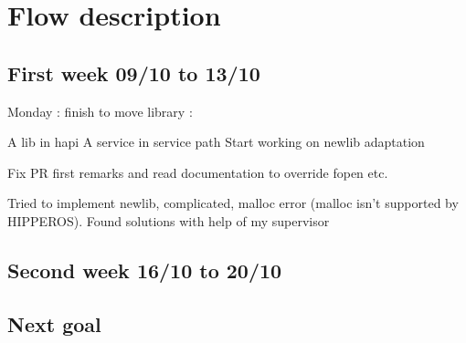 \documentclass[12pt]{article}
\begin{document}
\section{Flow description}
\subsection{First week 09/10 to 13/10}
Monday : finish to move library :

A lib in hapi
A service in service path
Start working on newlib adaptation

Fix PR first remarks and read documentation to override fopen etc.

Tried to implement newlib, complicated, malloc error (malloc isn't supported 
by HIPPEROS). 
Found solutions with help of my supervisor

\subsection{Second week 16/10 to 20/10}

\subsection{Next goal}
\end{document}
